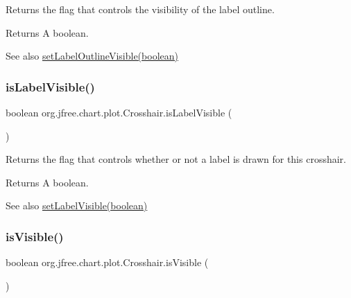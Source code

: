 Returns the flag that controls the visibility of the label outline.

\begin{DoxyReturn}{Returns}
A boolean.
\end{DoxyReturn}
\begin{DoxySeeAlso}{See also}
\mbox{\hyperlink{classorg_1_1jfree_1_1chart_1_1plot_1_1_crosshair_aaaf481eb9eccc5fa2b4f2a972f1aa1be}{set\+Label\+Outline\+Visible(boolean)}} 
\end{DoxySeeAlso}
\mbox{\label{classorg_1_1jfree_1_1chart_1_1plot_1_1_crosshair_a57d3fed41cf715e092ccee249b19ee12}} 
\subsubsection{\texorpdfstring{is\+Label\+Visible()}{isLabelVisible()}}
{\footnotesize\ttfamily boolean org.\+jfree.\+chart.\+plot.\+Crosshair.\+is\+Label\+Visible (\begin{DoxyParamCaption}{ }\end{DoxyParamCaption})}

Returns the flag that controls whether or not a label is drawn for this crosshair.

\begin{DoxyReturn}{Returns}
A boolean.
\end{DoxyReturn}
\begin{DoxySeeAlso}{See also}
\mbox{\hyperlink{classorg_1_1jfree_1_1chart_1_1plot_1_1_crosshair_ad7c7a7056ae228ddc663c8c7a64cedf2}{set\+Label\+Visible(boolean)}} 
\end{DoxySeeAlso}
\mbox{\label{classorg_1_1jfree_1_1chart_1_1plot_1_1_crosshair_aebe636459c5fdca37f13bedfd0a070f8}} 
\subsubsection{\texorpdfstring{is\+Visible()}{isVisible()}}
{\footnotesize\ttfamily boolean org.\+jfree.\+chart.\+plot.\+Crosshair.\+is\+Visible (\begin{DoxyParamCaption}{ }\end{DoxyParamCaption})}

